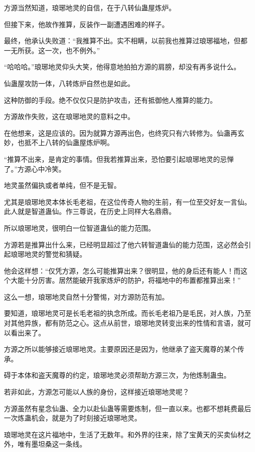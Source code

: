 \begin{this_body}
方源当然知道，琅琊地灵的自信，在于八转仙蛊屋炼炉。

但接下来，他故作推算，反装作一副遭遇困难的样子。

最终，他承认失败道：“我推算不出。实不相瞒，以前我也推算过琅琊福地，但都一无所获。这一次，也不例外。”

“哈哈哈。”琅琊地灵仰头大笑，他得意地拍拍方源的肩膀，却没有再多说什么。

仙蛊屋攻防一体，八转炼炉自然也是如此。

这种防御的手段。绝不仅仅只是防护攻击，还有抵御他人推算的能力。

方源故作失败，这在琅琊地灵的意料之中。

在他想来，这是应该的。因为就算方源再出色，也终究只有六转修为。仙蛊再玄妙，也抵不上八转的仙蛊屋炼炉啊。

“推算不出来，是肯定的事情。但我若推算出来，恐怕要引起琅琊地灵的忌惮了。”方源心中冷笑。

地灵虽然偏执或者单纯，但不是无智。

尤其是琅琊地灵本体长毛老祖，在这位传奇人物的生前，有一位至交好友一言仙。此人就是智道蛊仙。作三尊说，在历史上同样大名鼎鼎。

所以琅琊地灵，很明白一位智道蛊仙的能力范围。

方源若是推算出什么来，已经明显超过了他六转智道蛊仙的能力范围，这必然会引起琅琊地灵的警觉和猜疑。

他会这样想：“仅凭方源，怎么可能推算出来？很明显，他的身后还有能人！而这个大能十分厉害。居然能破开我家炼炉的防护，将福地中的布置都推算出来！”

这么一想，琅琊地灵自然十分警惕，对方源防范有加。

要知道，琅琊地灵可是长毛老祖的执念所成。而长毛老祖乃是毛民，对人族，乃至对其他异族，都有防范之心。这点从前世，琅琊地灵转变出来的性情和言语，就可以看出来了。

方源之所以能够接近琅琊地灵。主要原因还是因为，他继承了盗天魔尊的某个传承。

碍于本体和盗天魔尊的约定，琅琊地灵必须帮助方源三次，为他炼制蛊虫。

若非如此，方源怎可能以人族的身份，这样接近琅琊地灵呢？

方源虽然有星念仙蛊、全力以赴仙蛊等需要炼制，但一直以来。也都不想耗费最后一次炼蛊机会，就是为了时刻接近琅琊地灵。

琅琊地灵在这片福地中，生活了无数年。和外界的往来，除了宝黄天的买卖仙材之外，唯有墨坦桑这一条线。


\end{this_body}
